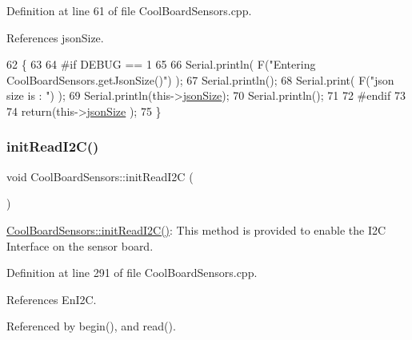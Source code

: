 Definition at line 61 of file Cool\+Board\+Sensors.\+cpp.



References json\+Size.


\begin{DoxyCode}
62 \{
63 
64 \textcolor{preprocessor}{#if DEBUG == 1}
65 
66     Serial.println( F(\textcolor{stringliteral}{"Entering CoolBoardSensors.getJsonSize()"}) );
67     Serial.println();
68     Serial.print( F(\textcolor{stringliteral}{"json size is : "}) );
69     Serial.println(this->\hyperlink{classCoolBoardSensors_a05a40dc80bfff14ffb830f549b876f8d}{jsonSize});
70     Serial.println();
71 
72 \textcolor{preprocessor}{#endif}
73 
74     \textcolor{keywordflow}{return}(this->\hyperlink{classCoolBoardSensors_a05a40dc80bfff14ffb830f549b876f8d}{jsonSize} );
75 \}
\end{DoxyCode}
\mbox{\label{classCoolBoardSensors_acad6a8418c66d36868caca23c844ecb6}} 
\subsubsection{\texorpdfstring{init\+Read\+I2\+C()}{initReadI2C()}}
{\footnotesize\ttfamily void Cool\+Board\+Sensors\+::init\+Read\+I2C (\begin{DoxyParamCaption}{ }\end{DoxyParamCaption})}

\hyperlink{classCoolBoardSensors_acad6a8418c66d36868caca23c844ecb6}{Cool\+Board\+Sensors\+::init\+Read\+I2\+C()}\+: This method is provided to enable the I2C Interface on the sensor board. 

Definition at line 291 of file Cool\+Board\+Sensors.\+cpp.



References En\+I2C.



Referenced by begin(), and read().


